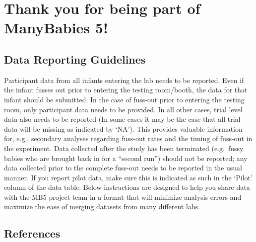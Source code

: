 \documentclass[
  letterpaper,
  DIV=11,
  numbers=noendperiod,
  oneside]{scrreprt}
\begin{document}
\part{Thank you for being part of ManyBabies 5!}

\chapter{Data Reporting Guidelines}\label{sec-datareporting}

Participant data from all infants entering the lab needs to be reported.
Even if the infant fusses out prior to entering the testing room/booth,
the data for that infant should be submitted. In the case of fuss-out
prior to entering the testing room, only participant data needs to be
provided. In all other cases, trial level data also needs to be reported
(In some cases it may be the case that all trial data will be missing as
indicated by `NA'). This provides valuable information for, e.g.,
secondary analyses regarding fuss-out rates and the timing of fuss-out
in the experiment. Data collected after the study has been terminated
(e.g.~fussy babies who are brought back in for a ``second run'') should
not be reported; any data collected prior to the complete fuss-out needs
to be reported in the usual manner. If you report pilot data, make sure
this is indicated as such in the `Pilot' column of the data table. Below
instructions are designed to help you share data with the MB5 project
team in a format that will minimize analysis errors and maximize the
ease of merging datasets from many different labs.


\chapter*{References}\label{references}

\end{document}
